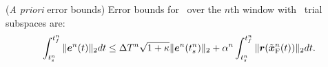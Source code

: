 \begin{theorem}(\textit{A priori} error bounds)\label{theorem:apriori_bound}
Error bounds for \methodAcronymROMs\ over the $n$th window with \spatialAcronym\ trial subspaces are:
\begin{equation}\label{eq:apriori_bound}
\int_{t_s^{n}}^{t_f^{n}} \| \boldsymbol e^{n}(t) \|_2 dt \le \Delta T^{n} \sqrt{1 + \kappa} \|  \boldsymbol e^{n}(t_s^{n})   \|_2   + \alpha^{n} \int_{t_s^{n}}^{t_f^{n}} \|  \boldsymbol r(\tilde{\boldsymbol x}_{\text{F}}^{n}(t))  \|_2 dt.
\end{equation}
\end{theorem}
